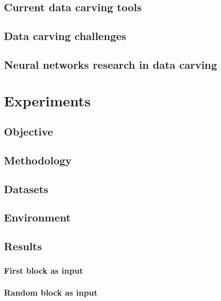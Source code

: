     \section{Current data carving tools}
    
    \section{Data carving challenges}
    
    \section{Neural networks research in data carving}
    
% 
% 
% 
\chapter{\label{chap:experiments}Experiments}


    \section{Objective}
    
    \section{Methodology}
    
    \section{Datasets}
    
    \section{Environment}
    
    \section{Results}
    
        \subsection{First block as input}
        
        \subsection{Random block as input}
        
